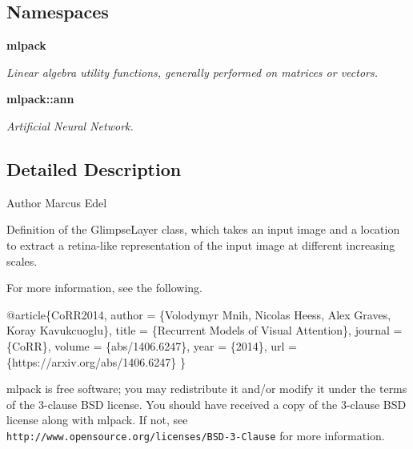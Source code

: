 \subsection*{Namespaces}
\begin{DoxyCompactItemize}
\item 
 \textbf{ mlpack}
\begin{DoxyCompactList}\small\item\em Linear algebra utility functions, generally performed on matrices or vectors. \end{DoxyCompactList}\item 
 \textbf{ mlpack\+::ann}
\begin{DoxyCompactList}\small\item\em Artificial Neural Network. \end{DoxyCompactList}\end{DoxyCompactItemize}


\subsection{Detailed Description}
\begin{DoxyAuthor}{Author}
Marcus Edel
\end{DoxyAuthor}
Definition of the Glimpse\+Layer class, which takes an input image and a location to extract a retina-\/like representation of the input image at different increasing scales.

For more information, see the following.


\begin{DoxyCode}
@article\{CoRR2014,
  author  = \{Volodymyr Mnih, Nicolas Heess, Alex Graves, Koray Kavukcuoglu\},
  title   = \{Recurrent Models of Visual Attention\},
  journal = \{CoRR\},
  volume  = \{abs/1406.6247\},
  year    = \{2014\},
  url     = \{https:\textcolor{comment}{//arxiv.org/abs/1406.6247\}}
\}
\end{DoxyCode}


mlpack is free software; you may redistribute it and/or modify it under the terms of the 3-\/clause B\+SD license. You should have received a copy of the 3-\/clause B\+SD license along with mlpack. If not, see {\tt http\+://www.\+opensource.\+org/licenses/\+B\+S\+D-\/3-\/\+Clause} for more information. 
